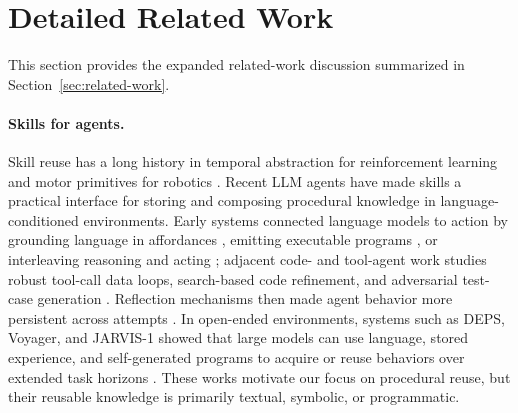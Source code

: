 
\section{Detailed Related Work}
\label{app:related-work}

This section provides the expanded related-work discussion summarized in Section~\ref{sec:related-work}.

\paragraph{Skills for agents.}
Skill reuse has a long history in temporal abstraction for reinforcement learning and motor primitives for robotics \citep{sutton1999options,ijspeert2013dmp}. Recent LLM agents have made skills a practical interface for storing and composing procedural knowledge in language-conditioned environments. Early systems connected language models to action by grounding language in affordances \citep{ichter2022saycan}, emitting executable programs \citep{liang2023codepolicies}, or interleaving reasoning and acting \citep{yao2023react}; adjacent code- and tool-agent work studies robust tool-call data loops, search-based code refinement, and adversarial test-case generation \citep{zhang2025looptoolclosingdatatrainingloop,li2025rethinkmctsrefiningerroneousthoughts,li2026atgen}. Reflection mechanisms then made agent behavior more persistent across attempts \citep{shinn2023reflexion}. In open-ended environments, systems such as DEPS, Voyager, and JARVIS-1 showed that large models can use language, stored experience, and self-generated programs to acquire or reuse behaviors over extended task horizons \citep{wang2024deps,wang2023voyager,wang2023jarvis}. These works motivate our focus on procedural reuse, but their reusable knowledge is primarily textual, symbolic, or programmatic.


